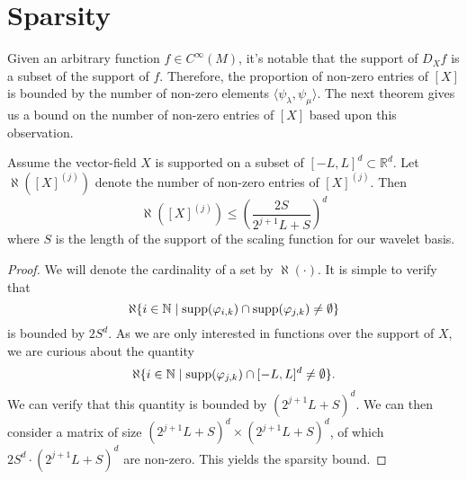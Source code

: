 \section{Sparsity}
  Given an arbitrary function $f \in C^{\infty}(M)$, it's notable that the support of $D_X f$ is a subset of the support of $f$.
  Therefore, the proportion of non-zero entries of $[X]$ is bounded by the number of non-zero elements $\langle \psi_\lambda , \psi_\mu \rangle$.
  The next theorem gives us a bound on the number of non-zero entries of $[X]$ based upon this observation.
  
  \begin{theorem}
  Assume the vector-field $X$ is supported on a subset of $[-L,L]^d \subset \mathbb{R}^d$.
  Let $\aleph( [X]^{(j)})$ denote the number of non-zero entries of $[X]^{(j)}$.  Then
  \[
  	\aleph( [X]^{(j)} ) \leq \left( \frac{2 S }{2^{j+1}L + S} \right)^d
  \]
  where $S$ is the length of the support of the scaling function for our wavelet basis.
  \end{theorem}
  \begin{proof}
  We will denote the cardinality of a set by $\aleph( \cdot )$.
  It is simple to verify that
  \[
  	\aleph \{ i \in \mathbb{N} \mid {\rm supp}( \phi_{i,k} ) \cap {\rm supp}( \phi_{j,k} ) \neq \emptyset \}
  \]
  is bounded by $2S^d$.
  As we are only interested in functions over the support of $X$, we are curious about the quantity
  \[
  	\aleph \{ i \in \mathbb{N} \mid {\rm supp}( \phi_{j,k} ) \cap [-L,L]^d \neq \emptyset \}.
  \]
  We can verify that this quantity is bounded by $(2^{j+1}L+S)^d$.
  We can then consider a matrix of size $(2^{j+1} L + S)^d \times (2^{j+1} L + S )^d$,
  of which $2S^d \cdot (2^{j+1} L + S)^d$ are non-zero.
  This yields the sparsity bound.  
  \end{proof}
